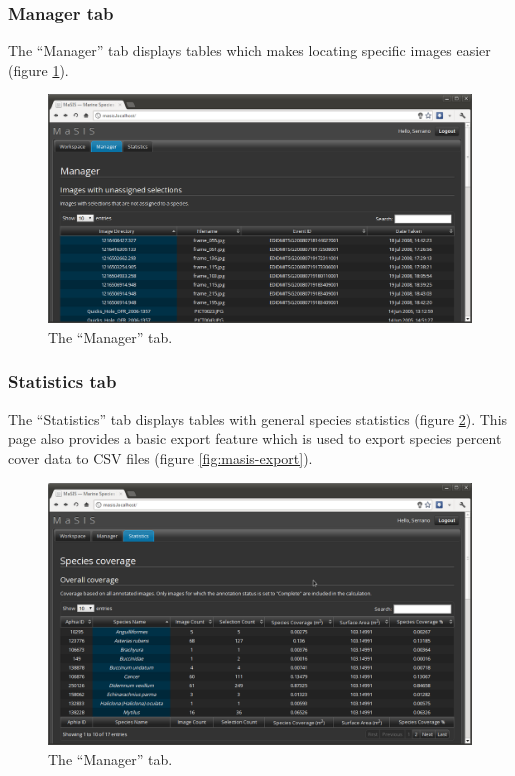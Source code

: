\documentclass[twoside,a4paper]{refart}
\begin{document}
\subsubsection{Manager tab}
\label{Manager tab}

The ``Manager'' tab displays tables which makes locating specific images easier (figure \ref{fig:masis-manager}).

\begin{figure}[hbtp]
\centering
\includegraphics[width=\textwidth]{screenshots/masis-manager}
\caption{The ``Manager'' tab.}
\label{fig:masis-manager}
\end{figure}

\subsubsection{Statistics tab}
\label{Statistics tab}

The ``Statistics'' tab displays tables with general species statistics (figure \ref{fig:masis-statistics}). This page also provides a basic export feature which is used to export species percent cover data to CSV files (figure \ref{fig:masis-export}).

\begin{figure}[hbtp]
\centering
\includegraphics[width=\textwidth]{screenshots/masis-statistics}
\caption{The ``Manager'' tab.}
\label{fig:masis-statistics}
\end{figure}
\end{document}
